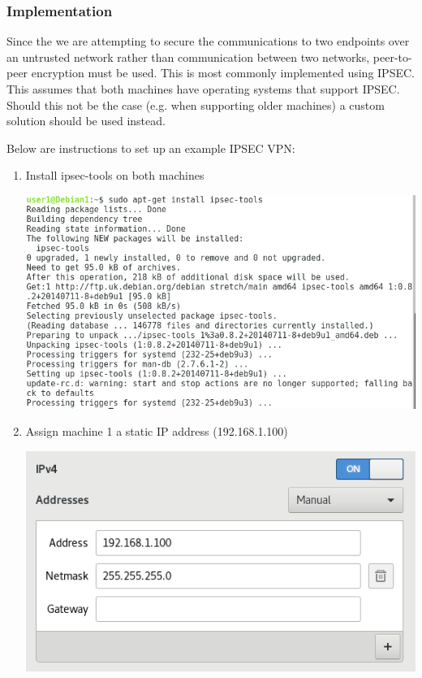 \documentclass[12pt]{article}
\begin{document}
\subsubsection{Implementation}
Since the we are attempting to secure the communications to two endpoints over an untrusted network rather than communication between two networks, peer-to-peer encryption must be used. This is most commonly implemented using IPSEC. This assumes that both machines have operating systems that support IPSEC. Should this not be the case (e.g. when supporting older machines) a custom solution should be used instead.

Below are instructions to set up an example IPSEC VPN:

\begin{enumerate}
\item{Install ipsec-tools on both machines 

\includegraphics[scale=0.5]{res/install_ipsec_tools}}

\item{Assign machine 1 a static IP address (192.168.1.100)

\includegraphics[scale=0.5]{res/machine1/static_ip}}



\end{enumerate}
\end{document}
